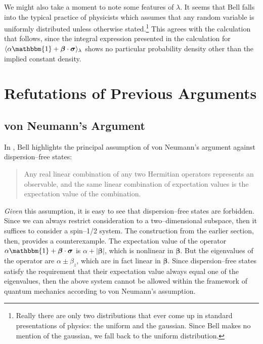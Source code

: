 \documentclass[12pt]{article}
\begin{document}
We might also take a moment to note some features of $\lambda$. It seems that Bell falls into the typical practice of physicists which assumes that any random variable is uniformly distributed unless otherwise stated.\footnote{Really there are only two distributions that ever come up in standard presentations of physics: the uniform and the gaussian. Since Bell makes no mention of the gaussian, we fall back to the uniform distribution.} This agrees with the calculation that follows, since the integral expression presented in the calculation for $\langle \alpha \mathbbm{1} + \bm{\beta} \cdot \bm{\sigma} \rangle_{\lambda}$ shows no particular probability density other than the implied constant density.

\section{Refutations of Previous Arguments}

\subsection{von Neumann's Argument}

In \cite[pp.448--449]{Bell1966}, Bell highlights the principal assumption of von Neumann's argument against dispersion--free states:
\begin{quote}
  Any real linear combination of any two Hermitian operators represents an observable, and the same linear combination of expectation values is the expectation value of the combination.
\end{quote}
\emph{Given} this assumption, it is easy to see that dispersion--free states are forbidden.  Since we can always restrict consideration to a two--dimensional subspace, then it suffices to consider a spin--1/2 system.  The construction from the earlier section, then, provides a counterexample.  The expectation value of the operator $\alpha \mathbbm{1} + \bm{\beta} \cdot \bm{\sigma}$ is $\alpha + |\bm{\beta}|$, which is nonlinear in $\bm{\beta}$.  But the eigenvalues of the operator are $\alpha \pm \beta_z$, which are in fact linear in $\bm{\beta}$.  Since dispersion--free states satisfy the requirement that their expectation value always equal one of the eigenvalues, then the above system cannot be allowed within the framework of quantum mechanics according to von Neumann's assumption.
\end{document}
